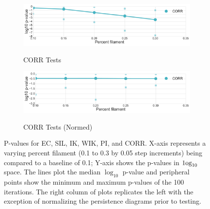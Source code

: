 \documentclass[12pt]{article}
\begin{document}
\begin{center}
\begin{figure}[htp!]
\begin{subfigure}{.45\textwidth}
      \label{fig:sub_weight_normed}
    \end{subfigure}
    \begin{subfigure}{.45\textwidth}
      \caption{CORR Tests}
      \includegraphics[width=\linewidth]{figure_8_correlation_group.pdf}
      \label{fig:sub_corr}
    \end{subfigure}
    \begin{subfigure}{.45\textwidth}
      \caption{CORR Tests (Normed)}
      \includegraphics[width=\linewidth]{figure_8_correlation_group_normed.pdf}
      \label{fig:sub_corr_normed}
    \end{subfigure}
  \caption{P-values for EC, SIL, IK, WIK, PI, and CORR. X-axis represents a varying percent filament (0.1 to 0.3 by 0.05 step increments) being compared to a baseline of 0.1; Y-axis shows the p-values in $\textup{1og}_{10}$ space. The lines plot the median $\log_{10}$ p-value and peripheral points show the minimum and maximum p-values of the 100 iterations. The right column of plots replicates the left with the exception of normalizing the persistence diagrams prior to testing.}
  \label{fig:sub_unstandardized_results}
  \end{figure}
\end{center}
\end{document}
